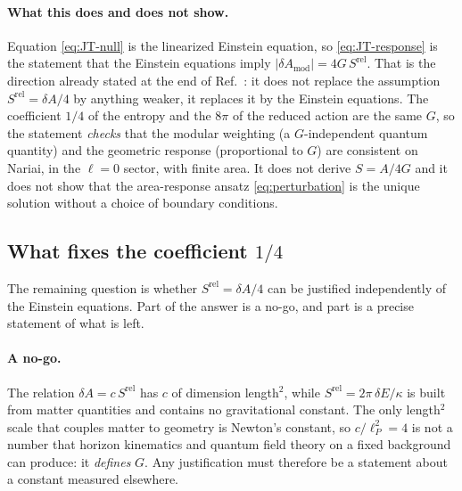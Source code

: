 \documentclass[11pt]{article}
\newcommand{\Srel}{S^{\mathrm{rel}}}
\begin{document}
\paragraph{What this does and does not show.} Equation \eqref{eq:JT-null} is the linearized Einstein equation, so \eqref{eq:JT-response} is the statement that the Einstein equations imply $|\delta A_{\mathrm{mod}}|=4G\,\Srel$. That is the direction already stated at the end of Ref.~\cite{DorauMuch}: it does not replace the assumption $\Srel=\delta A/4$ by anything weaker, it replaces it by the Einstein equations. The coefficient $1/4$ of the entropy and the $8\pi$ of the reduced action are the same $G$, so the statement \emph{checks} that the modular weighting (a $G$-independent quantum quantity) and the geometric response (proportional to $G$) are consistent on Nariai, in the $\ell=0$ sector, with finite area. It does not derive $S=A/4G$ and it does not show that the area-response ansatz \eqref{eq:perturbation} is the unique solution without a choice of boundary conditions.

\subsection{What fixes the coefficient $1/4$}
\label{sec:norm}

The remaining question is whether $\Srel=\delta A/4$ can be justified independently of the Einstein equations. Part of the answer is a no-go, and part is a precise statement of what is left.

\paragraph{A no-go.} The relation $\delta A=c\,\Srel$ has $c$ of dimension length$^2$, while $\Srel=2\pi\,\delta E/\kappa$ is built from matter quantities and contains no gravitational constant. The only length$^2$ scale that couples matter to geometry is Newton's constant, so $c/\ell_P^2=4$ is not a number that horizon kinematics and quantum field theory on a fixed background can produce: it \emph{defines} $G$. Any justification must therefore be a statement about a constant measured elsewhere.
\end{document}
